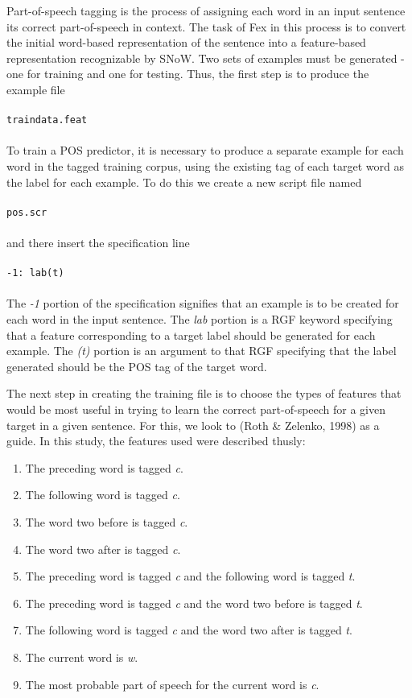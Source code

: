 \documentclass[11pt]{article}
\begin{document}
Part-of-speech tagging is the process of assigning each word in an input
sentence its correct part-of-speech in context.  The task of Fex in this process
is to convert the initial word-based representation of the sentence into a
feature-based representation recognizable by SNoW.  Two sets of examples must be
generated - one for training and one for testing.  Thus, the first step is to 
produce the example file \\\\
{\tt traindata.feat} \\\\
To train a POS predictor, it is necessary to produce a separate example for 
each word in the tagged training corpus, using the existing tag of each target
word as the label for each example.  To do this we create a new script file
named \\\\
{\tt pos.scr} \\\\
and there insert the specification line\\\\
{\tt -1: lab(t)}\\\\
The {\em -1} portion of the specification signifies that an example is to be
created for each word in the input sentence.  The {\em lab} portion is a
RGF keyword specifying that a feature corresponding to a target
label should be generated for each example. The {\em (t)} portion is an argument
to that RGF specifying that the label generated should be the POS
tag of the target word.

The next step in creating the training file is to choose the types of features
that would be most useful in trying to learn the correct part-of-speech for a 
given target in a given sentence.  For this, we look to (Roth \& Zelenko, 1998) 
as a guide.  In this study, the features used were described thusly:
\begin{enumerate}
\item
The preceding word is tagged {\em c}.
\item
The following word is tagged {\em c}.
\item
The word two before is tagged {\em c}.
\item
The word two after is tagged {\em c}.
\item
The preceding word is tagged {\em c} and the following word is tagged {\em t}.
\item
The preceding word is tagged {\em c} and the word two before is tagged {\em t}.
\item
The following word is tagged {\em c} and the word two after is tagged {\em t}.
\item 
The current word is {\em w}.
\item
The most probable part of speech for the current word is {\em c}.
\end{enumerate}
\end{document}
